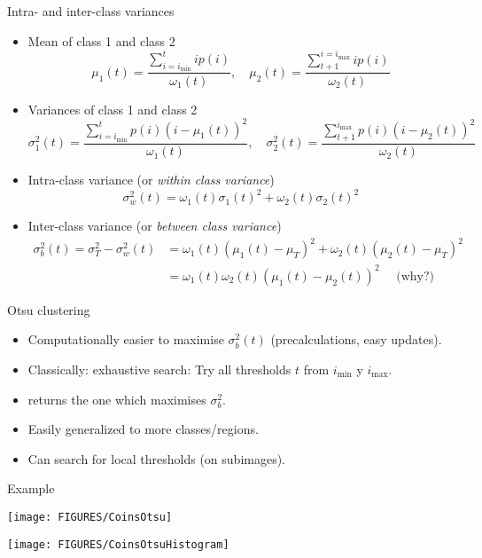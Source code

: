 \documentclass[9pt]{beamer}
\begin{document}
\begin{frame}{Intra- and inter-class variances}
  \begin{itemize}[<+->]
  \item Mean of class 1 and class 2
    $$
    \mu_1(t) = \frac{ \sum_{i=i_{\min}}^t ip(i)}{\omega_1(t)},\quad
    \mu_2(t) = \frac{ \sum_{t+1}^{i=i_{\max}} ip(i)}{\omega_2(t)}
    $$
  \item Variances of class 1 and class 2
    $$
    \sigma_1^2(t) = \frac{ \sum_{i=i_{\min}}^t p(i)(i-\mu_1(t))^2}{\omega_1(t)},\quad
    \sigma_2^2(t) = \frac{ \sum_{t+1}^{i_{\max}} p(i)(i-\mu_2(t))^2}{\omega_2(t)}
    $$
  \item Intra-class variance (or \emph{within class variance})
    $$
    \sigma_w^2(t) = \omega_1(t)\sigma_1(t)^2 + \omega_2(t)\sigma_2(t)^2 
    $$
  \item Inter-class variance (or \emph{between class variance})
    \begin{align*}
      \sigma_b^2(t) = \sigma_T^2 - \sigma_w^2(t) &= \omega_1(t)(\mu_1(t)-\mu_T)^2 + \omega_2(t)(\mu_2(t)-\mu_T)^2\\
      &=\omega_1(t)\omega_2(t)\left(\mu_1(t)-\mu_2(t)\right)^2\quad\text{ (why?)}
    \end{align*}
  \end{itemize}
\end{frame}

\begin{frame}{Otsu clustering}
  \begin{itemize}
  \item Computationally easier to maximise $\sigma_b^2(t)$ (precalculations, easy updates).\vfill
  \item Classically: exhaustive search: Try all thresholds $t$ from $i_{\min}$ y $i_{\max}$.\vfill
  \item returns the one which maximises $\sigma_b^2$.\vfill
  \item Easily generalized to more classes/regions.\vfill
  \item Can search for local thresholds (on subimages).
  \end{itemize}
\end{frame}


\begin{frame}[t]{Example}
  \begin{center}
    \texttt{[image: FIGURES/CoinsOtsu]}
  \end{center}
  \begin{center}
    \texttt{[image: FIGURES/CoinsOtsuHistogram]}
  \end{center}
\end{frame}
\end{document}
